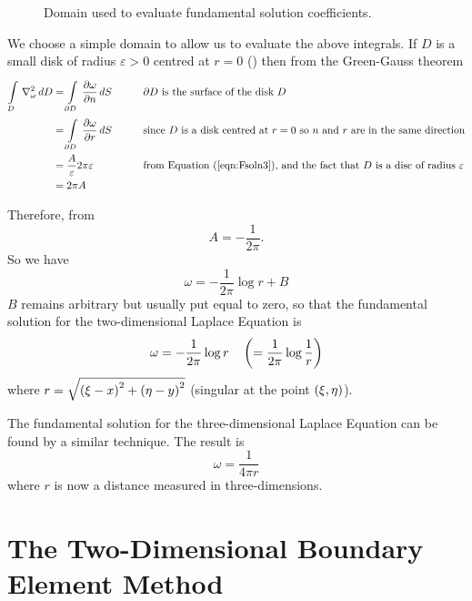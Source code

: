 \begin{figure}[htbp] \centering
  
  \caption{Domain used to evaluate fundamental solution coefficients.}
  \label{fig:domused}
\end{figure}

We choose a simple domain to allow us to evaluate the above integrals. If $D$
is a small disk of radius $\varepsilon > 0$ centred at $r = 0$
() then from the Green-Gauss theorem
\begin{alignat*}{2}
    \goneint{\laplacian{\omega}}{D} &= \gint{\del D}{}{\delby{\omega}{n}}{S}
    \qquad && \text{$\del D$ is the surface of the disk $D$} \\
    &= \gint{\del D}{}{\delby{\omega}{r}}{S} && 
    \text{since $D$ is a disk centred at $r=0$ so $n$ and $r$ are in the 
      same direction} \\ 
    &= \dfrac{A}{\varepsilon} 2\pi \varepsilon && 
   \text{from \eqnref{eqn:Fsoln3}, and the fact that $D$ is a disc of 
      radius $\varepsilon$} \\
    &=2 \pi A &&
\end{alignat*}

Therefore, from 
\begin{equation*}
  A = -\dfrac{1}{2 \pi}.
\end{equation*}
So we have  
\begin{equation*}
  \omega  =  - \dfrac{1}{2\pi}\log r  + B
\end{equation*} 
$B$ remains arbitrary but usually put equal to zero, so that the fundamental
solution for the two-dimensional Laplace Equation is
\begin{equation}
  \omega  =  - \dfrac{1}{2\pi}\log r \quad \left( = \dfrac{1}{2\pi}\log\dfrac{1}{r} \right)
  \label{eqn:2dLe}
\end{equation}
where $r = \sqrt{\left( \xi - x \right)^{2} + \left( \eta - y \right)^{2}}$ (singular at the
point $\left( \xi,\eta \right)$).

The fundamental solution for the three-dimensional Laplace Equation can be 
found by a similar technique.  The result is
\begin{equation*}
  \omega = \dfrac{1}{4\pi r}
\end{equation*}
where $r$ is now a distance measured in three-dimensions.

\section{The Two-Dimensional Boundary Element Method}
\label{sec:The2-Dbem}

